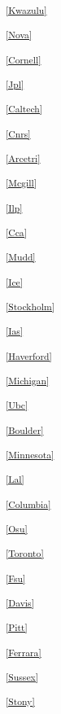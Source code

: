 \begin{multicols}{2}
\noindent
\textsuperscript{\ref{Kwazulu}}\Kwazulutext

\noindent
\textsuperscript{\ref{Nova}}\Novatext

\noindent
\textsuperscript{\ref{Cornell}}\Cornelltext

\noindent
\textsuperscript{\ref{Jpl}}\Jpltext

\noindent
\textsuperscript{\ref{Caltech}}\Caltechtext

\noindent
\textsuperscript{\ref{Cnrs}}\Cnrstext

\noindent
\textsuperscript{\ref{Arcetri}}\Arcetritext

\noindent
\textsuperscript{\ref{Mcgill}}\Mcgilltext

\noindent
\textsuperscript{\ref{Ilp}}\Ilptext

\noindent
\textsuperscript{\ref{Cca}}\Ccatext

\noindent
\textsuperscript{\ref{Mudd}}\Muddtext

\noindent
\textsuperscript{\ref{Ice}}\Icetext

\noindent
\textsuperscript{\ref{Stockholm}}\Stockholmtext

\noindent
\textsuperscript{\ref{Ias}}\Iastext

\noindent
\textsuperscript{\ref{Haverford}}\Haverfordtext

\noindent
\textsuperscript{\ref{Michigan}}\Michigantext

\noindent
\textsuperscript{\ref{Ubc}}\Ubctext

\noindent
\textsuperscript{\ref{Boulder}}\Bouldertext

\noindent
\textsuperscript{\ref{Minnesota}}\Minnesotatext

\noindent
\textsuperscript{\ref{Lal}}\Laltext

\noindent
\textsuperscript{\ref{Columbia}}\Columbiatext

\noindent
\textsuperscript{\ref{Osu}}\Osutext

\noindent
\textsuperscript{\ref{Toronto}}\Torontotext

\noindent
\textsuperscript{\ref{Fsu}}\Fsutext

\noindent
\textsuperscript{\ref{Davis}}\Davistext

\noindent
\textsuperscript{\ref{Pitt}}\Pitttext

\noindent
\textsuperscript{\ref{Ferrara}}\Ferraratext

\noindent
\textsuperscript{\ref{Sussex}}\Sussextext

\noindent
\textsuperscript{\ref{Stony}}\Stonytext


\end{multicols}
